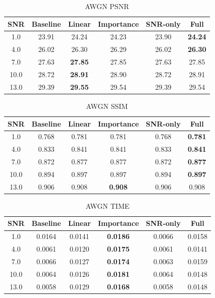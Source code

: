 \begin{table}[h]
\centering
\caption{AWGN PSNR}
\begin{tabular}{c|ccccc}
\hline
SNR & Baseline & Linear & Importance & SNR-only & Full \\ \hline
1.0 & 23.91 & 24.24 & 24.23 & 23.90 & \textbf{24.24} \\
4.0 & 26.02 & 26.30 & 26.29 & 26.02 & \textbf{26.30} \\
7.0 & 27.63 & \textbf{27.85} & 27.85 & 27.63 & 27.85 \\
10.0 & 28.72 & \textbf{28.91} & 28.90 & 28.72 & 28.91 \\
13.0 & 29.39 & \textbf{29.55} & 29.54 & 29.39 & 29.54 \\
\hline
\end{tabular}
\end{table}

\begin{table}[h]
\centering
\caption{AWGN SSIM}
\begin{tabular}{c|ccccc}
\hline
SNR & Baseline & Linear & Importance & SNR-only & Full \\ \hline
1.0 & 0.768 & 0.781 & 0.781 & 0.768 & \textbf{0.781} \\
4.0 & 0.833 & 0.841 & 0.841 & 0.833 & \textbf{0.841} \\
7.0 & 0.872 & 0.877 & 0.877 & 0.872 & \textbf{0.877} \\
10.0 & 0.894 & 0.897 & 0.897 & 0.894 & \textbf{0.897} \\
13.0 & 0.906 & 0.908 & \textbf{0.908} & 0.906 & 0.908 \\
\hline
\end{tabular}
\end{table}

\begin{table}[h]
\centering
\caption{AWGN TIME}
\begin{tabular}{c|ccccc}
\hline
SNR & Baseline & Linear & Importance & SNR-only & Full \\ \hline
1.0 & 0.0164 & 0.0141 & \textbf{0.0186} & 0.0066 & 0.0158 \\
4.0 & 0.0061 & 0.0120 & \textbf{0.0175} & 0.0061 & 0.0141 \\
7.0 & 0.0066 & 0.0127 & \textbf{0.0174} & 0.0063 & 0.0159 \\
10.0 & 0.0064 & 0.0126 & \textbf{0.0181} & 0.0064 & 0.0148 \\
13.0 & 0.0058 & 0.0129 & \textbf{0.0168} & 0.0058 & 0.0148 \\
\hline
\end{tabular}
\end{table}

